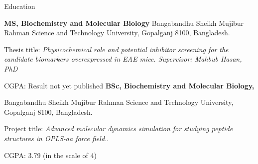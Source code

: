 \begin{rubric}{Education}

\entry*[2020 -- 2022]%
	\textbf{MS, Biochemistry and Molecular Biology} Bangabandhu Sheikh Mujibur Rahman Science and Technology University, Gopalganj 8100, Bangladesh.\par
	Thesis title: \emph{Physicochemical role and potential inhibitor screening for the candidate biomarkers overexpressed in EAE mice. Supervisor: Mahbub Hasan, PhD}\par
	CGPA: Result not yet published
%
\entry*[2016 -- 2019]%
	\textbf{BSc, Biochemistry and Molecular Biology, }\par
	Bangabandhu Sheikh Mujibur Rahman Science and Technology University, Gopalganj 8100, Bangladesh.\par
	Project title: \emph{Advanced molecular dynamics simulation for studying peptide structures in OPLS-aa force field.}.\par
	CGPA: 3.79 (in the scale of 4)
\end{rubric}